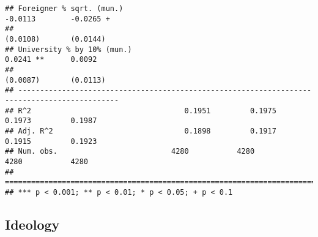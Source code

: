 \documentclass[
]{article}
\begin{document}
\begin{verbatim}
## Foreigner % sqrt. (mun.)                                           -0.0113        -0.0265 +  
##                                                                    (0.0108)       (0.0144)   
## University % by 10% (mun.)                                          0.0241 **      0.0092    
##                                                                    (0.0087)       (0.0113)   
## ---------------------------------------------------------------------------------------------
## R^2                                   0.1951         0.1975         0.1973         0.1987    
## Adj. R^2                              0.1898         0.1917         0.1915         0.1923    
## Num. obs.                          4280           4280           4280           4280         
## =============================================================================================
## *** p < 0.001; ** p < 0.01; * p < 0.05; + p < 0.1
\end{verbatim}

\hypertarget{ideology-5}{%
\subsection{Ideology}\label{ideology-5}}
\end{document}
